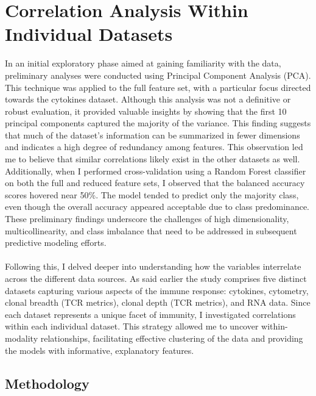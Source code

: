 \documentclass[12pt,a4paper]{report}
\begin{document}
\section{Correlation Analysis Within Individual Datasets}
\label{sec:correlation_analysis_within_individual_datasets}
\noindent
In an initial exploratory phase aimed at gaining familiarity with the data, preliminary analyses were conducted using Principal Component Analysis (PCA). This technique was applied to the full feature set, with a particular focus directed towards the cytokines dataset. Although this analysis was not a definitive or robust evaluation, it provided valuable insights by showing that the first 10 principal components captured the majority of the variance. This finding suggests that much of the dataset’s information can be summarized in fewer dimensions and indicates a high degree of redundancy among features. This observation led me to believe that similar correlations likely exist in the other datasets as well. Additionally, when I performed cross-validation using a Random Forest classifier on both the full and reduced feature sets, I observed that the balanced accuracy scores hovered near 50\%. The model tended to predict only the majority class, even though the overall accuracy appeared acceptable due to class predominance. These preliminary findings underscore the challenges of high dimensionality, multicollinearity, and class imbalance that need to be addressed in subsequent predictive modeling efforts.\\
\\
Following this, I delved deeper into understanding how the variables interrelate across the different data sources. As said earlier the study comprises five distinct datasets capturing various aspects of the immune response: cytokines, cytometry, clonal breadth (TCR metrics), clonal depth (TCR metrics), and RNA data. Since each dataset represents a unique facet of immunity, I investigated correlations within each individual dataset.  This strategy allowed me to uncover within-modality relationships, facilitating effective clustering of the data and providing the models with informative, explanatory features.
\subsection{Methodology}
\end{document}
